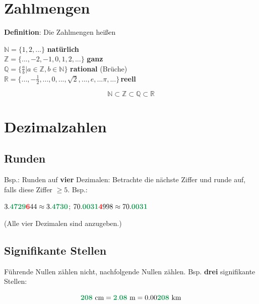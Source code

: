 \begin{multicols}{2}%

\section*{Zahlmengen}
\begin{tcolorbox}[colback=white]
\textbf{Definition}: Die Zahlmengen heißen

$\mathbb{N} = \{1,2, ...\}$                                   \textbf{natürlich}\\
$\mathbb{Z} = \{..., -2, -1, 0, 1,2, ...\}$                   \textbf{ganz}\\
$\mathbb{Q} = \{\frac{a}b|a\in \mathbb{Z},b\in\mathbb{N}\}$   \textbf{rational} (Brüche)\\
$\mathbb{R} = \{..., -\frac12, ..., 0, ..., \sqrt{2}, ..., e,
... \pi, ...\}$\,\textbf{reell}\\
\end{tcolorbox}

$$\mathbb{N} \subset \mathbb{Z} \subset \mathbb{Q} \subset \mathbb{R}$$

\hrulefill%

\section*{Dezimalzahlen}
\subsection*{Runden}
Bsp.: Runden auf \textbf{\color{ForestGreen}vier}  Dezimalen:
Betrachte die nächste Ziffer und runde auf, falls diese
{\color{red}Ziffer} $\ge 5$. Bsp.:

$3.\mathbf{\color{ForestGreen}4729}\mathbf{\color{red}6}44 \approx
3.\mathbf{\color{ForestGreen}4730}$; \hfill{ }
$70.\mathbf{\color{ForestGreen}0031}\mathbf{\color{red}4}998\approx
70.\mathbf{\color{ForestGreen}0031}$

(Alle vier Dezimalen sind anzugeben.)

\subsection*{Signifikante Stellen}
Führende Nullen zählen nicht, nachfolgende Nullen
zählen. Bsp. \textbf{\color{ForestGreen}drei} signifikante Stellen:

$$\mathbf{\color{ForestGreen}208} \textrm{ cm} = \mathbf{\color{ForestGreen}2.08} \textrm{ m} = 0.00\mathbf{\color{ForestGreen}208} \textrm{ km}$$


\end{multicols}
